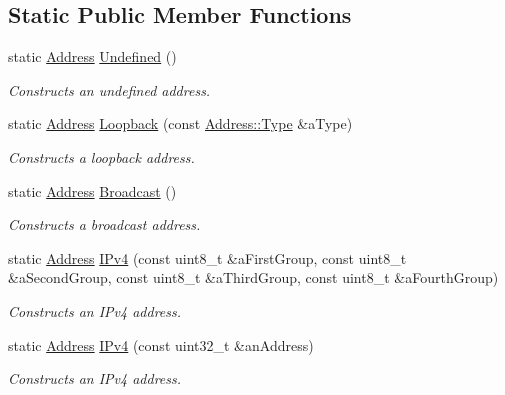 \subsection*{Static Public Member Functions}
\begin{DoxyCompactItemize}
\item 
static \hyperlink{classlibrary_1_1io_1_1ip_1_1_address}{Address} \hyperlink{classlibrary_1_1io_1_1ip_1_1_address_a6f567a698faa544fb27b52f02b3c52b6}{Undefined} ()
\begin{DoxyCompactList}\small\item\em Constructs an undefined address. \end{DoxyCompactList}\item 
static \hyperlink{classlibrary_1_1io_1_1ip_1_1_address}{Address} \hyperlink{classlibrary_1_1io_1_1ip_1_1_address_a79cb92d3917c101f3908ce6f251fffd7}{Loopback} (const \hyperlink{classlibrary_1_1io_1_1ip_1_1_address_a1a4f284eb6f5f52b67f2e34a93f225af}{Address\+::\+Type} \&a\+Type)
\begin{DoxyCompactList}\small\item\em Constructs a loopback address. \end{DoxyCompactList}\item 
static \hyperlink{classlibrary_1_1io_1_1ip_1_1_address}{Address} \hyperlink{classlibrary_1_1io_1_1ip_1_1_address_af08e4f162c4e91922edff360e0a1e198}{Broadcast} ()
\begin{DoxyCompactList}\small\item\em Constructs a broadcast address. \end{DoxyCompactList}\item 
static \hyperlink{classlibrary_1_1io_1_1ip_1_1_address}{Address} \hyperlink{classlibrary_1_1io_1_1ip_1_1_address_a046ddcc0011c0301e2d52f2aaf2e4bca}{I\+Pv4} (const uint8\+\_\+t \&a\+First\+Group, const uint8\+\_\+t \&a\+Second\+Group, const uint8\+\_\+t \&a\+Third\+Group, const uint8\+\_\+t \&a\+Fourth\+Group)
\begin{DoxyCompactList}\small\item\em Constructs an I\+Pv4 address. \end{DoxyCompactList}\item 
static \hyperlink{classlibrary_1_1io_1_1ip_1_1_address}{Address} \hyperlink{classlibrary_1_1io_1_1ip_1_1_address_a464ce60b6c4412f1b6515b4c0cb8d43d}{I\+Pv4} (const uint32\+\_\+t \&an\+Address)
\begin{DoxyCompactList}\small\item\em Constructs an I\+Pv4 address. \end{DoxyCompactList}\item 

\end{DoxyCompactItemize}
